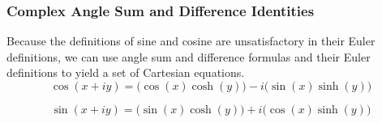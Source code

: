 \subsubsection{Complex Angle Sum and Difference Identities}\label{subsec:Complex_Angle_Sum_Difference_Identities}
Because the definitions of sine and cosine are unsatisfactory in their Euler definitions, we can use angle sum and difference formulas and their Euler definitions to yield a set of Cartesian equations.
\begin{equation}\label{eq:Cos_Angle_Sum_Difference}
  \cos(x + iy) = \bigl( \cos(x) \cosh(y) \bigr) - i \bigl( \sin(x) \sinh(y) \bigr)
\end{equation}

\begin{equation}\label{eq:Sin_Angle_Sum_Difference}
  \sin(x + iy) = \bigl( \sin(x) \cosh(y) \bigr) + i \bigl( \cos(x) \sinh(y) \bigr)
\end{equation}

